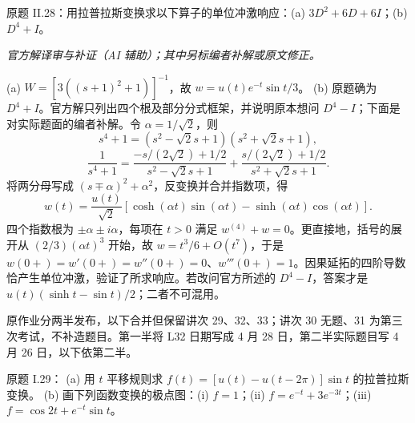 \begin{exercise}\label{cw:ps7-II-28}原题 II.28：用拉普拉斯变换求以下算子的单位冲激响应：(a) $3D^2+6D+6I$；(b) $D^4+I$。\end{exercise}
\begin{solution}
\textit{官方解译审与补证（AI 辅助）；其中另标编者补解或原文修正。}\par

(a) $W=[3((s+1)^2+1)]^{-1}$，故 $w=u(t)e^{-t}\sin t/3$。
(b) 原题确为 $D^4+I$。官方解只列出四个根及部分分式框架，并说明原本想问 $D^4-I$；下面是对实际题面的编者补解。令 $\alpha=1/\sqrt2$，则
\[s^4+1=(s^2-\sqrt2s+1)(s^2+\sqrt2s+1),\]
\[\frac1{s^4+1}=\frac{-s/(2\sqrt2)+1/2}{s^2-\sqrt2s+1}+\frac{s/(2\sqrt2)+1/2}{s^2+\sqrt2s+1}.\]
将两分母写成 $(s\mp\alpha)^2+\alpha^2$，反变换并合并指数项，得
\[w(t)=\frac{u(t)}{\sqrt2}\left[\cosh(\alpha t)\sin(\alpha t)-\sinh(\alpha t)\cos(\alpha t)\right].\]
四个指数根为 $\pm\alpha\pm i\alpha$，每项在 $t>0$ 满足 $w^{(4)}+w=0$。更直接地，括号的展开从 $(2/3)(\alpha t)^3$ 开始，故 $w=t^3/6+O(t^7)$，于是 $w(0+)=w'(0+)=w''(0+)=0$、$w'''(0+)=1$。因果延拓的四阶导数恰产生单位冲激，验证了所求响应。若改问官方所述的 $D^4-I$，答案才是 $u(t)(\sinh t-\sin t)/2$；二者不可混用。
\end{solution}
原作业分两半发布，以下合并但保留讲次 29、32、33；讲次 30 无题、31 为第三次考试，不补造题目。第一半将 L32 日期写成 4 月 28 日，第二半实际题目写 4 月 26 日，以下依第二半。
\begin{exercise}\label{cw:ps8-I-29}原题 I.29：
(a) 用 $t$ 平移规则求 $f(t)=[u(t)-u(t-2\pi)]\sin t$ 的拉普拉斯变换。
(b) 画下列函数变换的极点图：(i) $f=1$；(ii) $f=e^{-t}+3e^{-3t}$；(iii) $f=\cos2t+e^{-t}\sin t$。\end{exercise}

